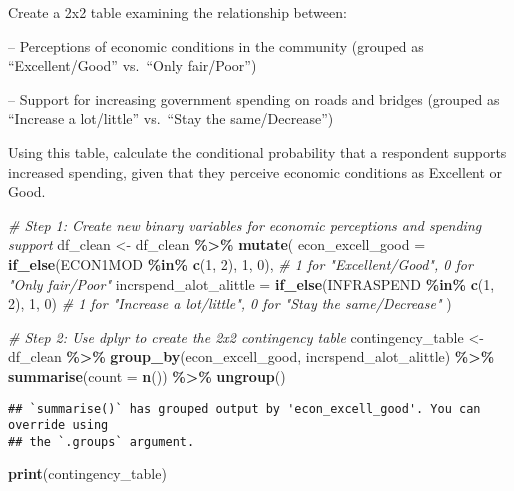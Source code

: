 \documentclass[
  11pt,
]{article}
\newenvironment{Shaded}{\begin{snugshade}}{\end{snugshade}}
\newcommand{\AttributeTok}[1]{\textcolor[rgb]{0.13,0.29,0.53}{#1}}
\newcommand{\CommentTok}[1]{\textcolor[rgb]{0.56,0.35,0.01}{\textit{#1}}}
\newcommand{\DecValTok}[1]{\textcolor[rgb]{0.00,0.00,0.81}{#1}}
\newcommand{\FunctionTok}[1]{\textcolor[rgb]{0.13,0.29,0.53}{\textbf{#1}}}
\newcommand{\NormalTok}[1]{#1}
\newcommand{\OtherTok}[1]{\textcolor[rgb]{0.56,0.35,0.01}{#1}}
\newcommand{\SpecialCharTok}[1]{\textcolor[rgb]{0.81,0.36,0.00}{\textbf{#1}}}
\begin{document}
Create a 2x2 table examining the relationship between:

-- Perceptions of economic conditions in the community (grouped as
``Excellent/Good'' vs.~``Only fair/Poor'')

-- Support for increasing government spending on roads and bridges
(grouped as ``Increase a lot/little'' vs.~``Stay the same/Decrease'')

Using this table, calculate the conditional probability that a
respondent supports increased spending, given that they perceive
economic conditions as Excellent or Good.

\begin{Shaded}
\begin{Highlighting}[]
\CommentTok{\# Step 1: Create new binary variables for economic perceptions and spending support}
\NormalTok{df\_clean }\OtherTok{\textless{}{-}}\NormalTok{ df\_clean }\SpecialCharTok{\%\textgreater{}\%}
  \FunctionTok{mutate}\NormalTok{(}
    \AttributeTok{econ\_excell\_good =} \FunctionTok{if\_else}\NormalTok{(ECON1MOD }\SpecialCharTok{\%in\%} \FunctionTok{c}\NormalTok{(}\DecValTok{1}\NormalTok{, }\DecValTok{2}\NormalTok{), }\DecValTok{1}\NormalTok{, }\DecValTok{0}\NormalTok{),  }\CommentTok{\# 1 for "Excellent/Good", 0 for "Only fair/Poor"}
    \AttributeTok{incrspend\_alot\_alittle =} \FunctionTok{if\_else}\NormalTok{(INFRASPEND }\SpecialCharTok{\%in\%} \FunctionTok{c}\NormalTok{(}\DecValTok{1}\NormalTok{, }\DecValTok{2}\NormalTok{), }\DecValTok{1}\NormalTok{, }\DecValTok{0}\NormalTok{)  }\CommentTok{\# 1 for "Increase a lot/little", 0 for "Stay the same/Decrease"}
\NormalTok{  )}

\CommentTok{\# Step 2: Use dplyr to create the 2x2 contingency table}
\NormalTok{contingency\_table }\OtherTok{\textless{}{-}}\NormalTok{ df\_clean }\SpecialCharTok{\%\textgreater{}\%}
  \FunctionTok{group\_by}\NormalTok{(econ\_excell\_good, incrspend\_alot\_alittle) }\SpecialCharTok{\%\textgreater{}\%}
  \FunctionTok{summarise}\NormalTok{(}\AttributeTok{count =} \FunctionTok{n}\NormalTok{()) }\SpecialCharTok{\%\textgreater{}\%}
  \FunctionTok{ungroup}\NormalTok{() }
\end{Highlighting}
\end{Shaded}

\begin{verbatim}
## `summarise()` has grouped output by 'econ_excell_good'. You can override using
## the `.groups` argument.
\end{verbatim}

\begin{Shaded}
\begin{Highlighting}[]
\FunctionTok{print}\NormalTok{(contingency\_table)}
\end{Highlighting}
\end{Shaded}
\end{document}
